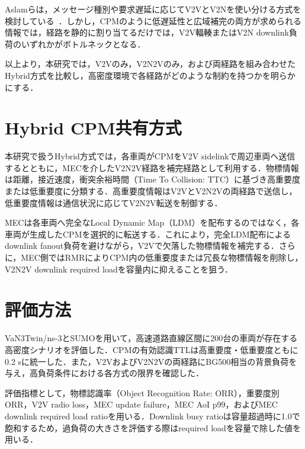 \documentclass[a4paper,10pt,twocolumn,uplatex]{jsarticle}
\begin{document}
Aslamらは，メッセージ種別や要求遅延に応じてV2VとV2Nを使い分ける方式を検討している~\cite{Aslam2025}．しかし，CPMのように低遅延性と広域補完の両方が求められる情報では，経路を静的に割り当てるだけでは，V2V輻輳またはV2N downlink負荷のいずれかがボトルネックとなる．

以上より，本研究では，V2Vのみ，V2N2Vのみ，および両経路を組み合わせたHybrid方式を比較し，高密度環境で各経路がどのような制約を持つかを明らかにする．

\section{Hybrid CPM共有方式}
本研究で扱うHybrid方式では，各車両がCPMをV2V sidelinkで周辺車両へ送信するとともに，MECを介したV2N2V経路を補完経路として利用する．物標情報は距離，接近速度，衝突余裕時間（Time To Collision: TTC）に基づき高重要度または低重要度に分類する．高重要度情報はV2VとV2N2Vの両経路で送信し，低重要度情報は通信状況に応じてV2N2V転送を制御する．

MECは各車両へ完全なLocal Dynamic Map（LDM）を配布するのではなく，各車両が生成したCPMを選択的に転送する．これにより，完全LDM配布によるdownlink fanout負荷を避けながら，V2Vで欠落した物標情報を補完する．さらに，MEC側ではRMRによりCPM内の低重要度または冗長な物標情報を削除し，V2N2V downlink required loadを容量内に抑えることを狙う．

\section{評価方法}
VaN3Twin/ns-3とSUMOを用いて，高速道路直線区間に200台の車両が存在する高密度シナリオを評価した．CPMの有効認識TTLは高重要度・低重要度ともに0.2 sに統一した．また，V2VおよびV2N2Vの両経路にBG500相当の背景負荷を与え，高負荷条件における各方式の限界を確認した．

評価指標として，物標認識率（Object Recognition Rate: ORR），重要度別ORR，V2V radio loss，MEC update failure，MEC AoI p99，およびMEC downlink required load ratioを用いる．Downlink busy ratioは容量超過時に1.0で飽和するため，過負荷の大きさを評価する際はrequired loadを容量で除した値を用いる．
\end{document}
